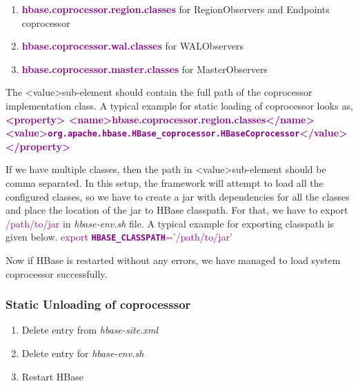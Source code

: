 \documentclass[11pt,a4paper,bibtotoc,idxtotoc,headsepline,footsepline,footexclude,BCOR12mm,DIV13]{scrbook}
\begin{document}
\begin{enumerate}
	
    \item \textbf{\textcolor{purple} {hbase.coprocessor.region.classes}} for RegionObservers and Endpoints coprocessor
    \item \textbf{\textcolor{purple} {hbase.coprocessor.wal.classes}} for WALObservers
    \item \textbf{\textcolor{purple} {hbase.coprocessor.master.classes}} for MasterObservers
    
\end{enumerate}


The \textless value\textgreater \space sub-element should contain the full path of the coprocessor implementation class. A typical example for static loading of coprocessor looks as,\newline \newline
\textbf{\textcolor{purple}{
\textless property\textgreater \newline
\textless name\textgreater hbase.coprocessor.region.classes\textless /name\textgreater \newline
\textless value\textgreater \texttt{org.apache.hbase.HBase\_coprocessor.HBaseCoprocessor}\textless /value\textgreater \newline
\textless /property\textgreater}} \newline

 If we have multiple classes, then the path in \textless value\textgreater \space sub-element should be comma separated. In this setup, the framework will attempt to load all the configured classes, so we have to create a jar with dependencies for all the classes and place the location of the jar to HBase classpath. For that, we have to export \textcolor{purple}{/path/to/jar} in \emph{hbase-env.sh} file. A typical example for exporting classpath is given below. \newline \newline
 \textcolor{purple}{export \textbf{\texttt{HBASE\_CLASSPATH}}='/path/to/jar'} \newline
 
Now if HBase is restarted without any errors, we have managed to load system coprocessor successfully. 

\subsubsection{Static Unloading of coprocesssor}
\begin{enumerate}
    \item Delete entry from \emph{hbase-site.xml}
    \item Delete entry for \emph{hbase-env.sh}
    \item Restart HBase
\end{enumerate}
\end{document}
